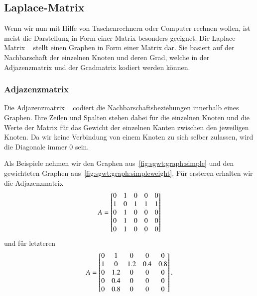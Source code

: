 \subsection{Laplace-Matrix\label{subsec:sgwt:laplacem}}
Wenn wir nun mit Hilfe von Taschenrechnern oder Computer rechnen wollen, ist 
meist die Darstellung in Form einer Matrix besonders geeignet. Die 
Laplace-Matrix \laplaceL{}~\cite{noauthor_laplace-matrix_2017} stellt einen 
Graphen in Form einer Matrix dar. Sie basiert auf der Nachbarschaft der 
einzelnen Knoten und deren Grad, welche in der Adjazenzmatrix und der 
Gradmatrix kodiert werden k\"onnen.

\subsubsection{Adjazenzmatrix \texorpdfstring{\adjacencyM{}}{A}}

Die Adjazenzmatrix \adjacencyM{}~\cite{noauthor_adjacency_2019} codiert die 
Nachbarschaftsbeziehungen innerhalb eines Graphen. Ihre Zeilen und Spalten 
stehen dabei f\"ur die einzelnen Knoten und die Werte der Matrix f\"ur das 
Gewicht der einzelnen Kanten zwischen den jeweiligen Knoten. Da wir keine 
Verbindung von einem Knoten zu sich selber zulassen, wird die Diagonale immer 
$0$ sein. 

Als Beispiele nehmen wir den Graphen aus~\cref{fig:sgwt:graph:simple} und den 
gewichteten Graphen aus~\cref{fig:sgwt:graph:simpleweight}. F\"ur ersteren 
erhalten wir die Adjazenzmatrix
\begin{equation*}
\adjacencyM =
\begin{bmatrix}
0 & 1 & 0 & 0 & 0 \\
1 & 0 & 1 & 1 & 1 \\
0 & 1 & 0 & 0 & 0 \\
0 & 1 & 0 & 0 & 0 \\
0 & 1 & 0 & 0 & 0
\end{bmatrix}
\end{equation*}
und f\"ur letzteren
\begin{equation*}
\adjacencyM =
\begin{bmatrix}
0 & 1 & 0 & 0 & 0 \\
1 & 0 & 1.2 & 0.4 & 0.8 \\
0 & 1.2 & 0 & 0 & 0 \\
0 & 0.4 & 0 & 0 & 0 \\
0 & 0.8 & 0 & 0 & 0
\end{bmatrix}.
\end{equation*}

